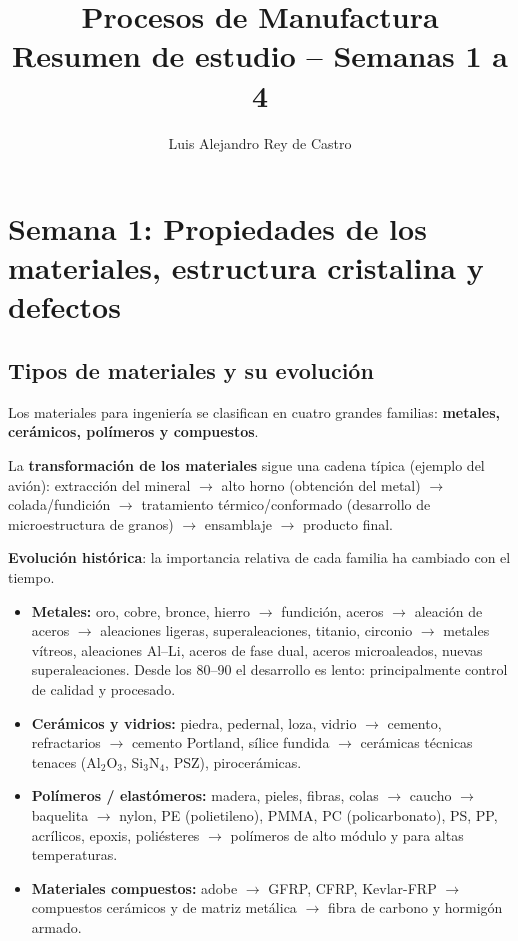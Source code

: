 \documentclass[12pt,a4paper]{article}
\title{\textbf{\color{azulprin}Procesos de Manufactura}\\[10pt]
\large Resumen de estudio -- Semanas 1 a 4}
\author{Luis Alejandro Rey de Castro}
\date{}
\begin{document}
\maketitle
\thispagestyle{fancy}

\section{Semana 1: Propiedades de los materiales, estructura cristalina y
  defectos}

\subsection{Tipos de materiales y su evolución}

Los materiales para ingeniería se clasifican en cuatro grandes familias:
\textbf{metales, cerámicos, polímeros y compuestos}.

La \textbf{transformación de los materiales} sigue una cadena típica (ejemplo
del avión): extracción del mineral $\rightarrow$ alto horno (obtención del
metal) $\rightarrow$ colada/fundición $\rightarrow$ tratamiento
térmico/conformado (desarrollo de microestructura de granos) $\rightarrow$
ensamblaje $\rightarrow$ producto final.

\textbf{Evolución histórica}: la importancia relativa de cada familia ha
cambiado con el tiempo.
\begin{itemize}
	\item \textbf{Metales:} oro, cobre, bronce, hierro $\rightarrow$ fundición,
	      aceros $\rightarrow$ aleación de aceros $\rightarrow$ aleaciones
	      ligeras,
	      superaleaciones, titanio, circonio $\rightarrow$ metales vítreos,
	      aleaciones
	      Al--Li, aceros de fase dual, aceros microaleados, nuevas
	      superaleaciones. Desde
	      los 80--90 el desarrollo es lento: principalmente control de calidad y
	      procesado.
	\item \textbf{Cerámicos y vidrios:} piedra, pedernal, loza, vidrio
	      $\rightarrow$ cemento, refractarios $\rightarrow$ cemento Portland,
	      sílice
	      fundida $\rightarrow$ cerámicas técnicas tenaces (Al$_2$O$_3$,
	      Si$_3$N$_4$,
	      PSZ), pirocerámicas.
	\item \textbf{Polímeros / elastómeros:} madera, pieles, fibras, colas
	      $\rightarrow$ caucho $\rightarrow$ baquelita $\rightarrow$ nylon, PE
	      (polietileno), PMMA, PC (policarbonato), PS, PP, acrílicos, epoxis,
	      poliésteres $\rightarrow$ polímeros de alto módulo y para altas
	      temperaturas.
	\item \textbf{Materiales compuestos:} adobe $\rightarrow$ GFRP, CFRP,
	      Kevlar-FRP $\rightarrow$ compuestos cerámicos y de matriz metálica
	      $\rightarrow$ fibra de carbono y hormigón armado.
\end{itemize}
\end{document}
